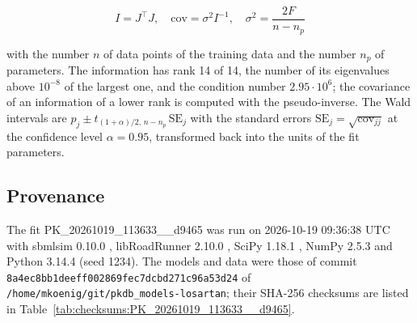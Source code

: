 \documentclass{article}
\begin{document}
\begin{equation}
I = J^\top J, \quad \mathrm{cov} = \sigma^2 I^{-1}, \quad \sigma^2 = \frac{2 F}{n - n_p}
\end{equation}

with the number $n$ of data points of the training data and the number $n_p$ of parameters. The information has rank 14 of 14, the number of its eigenvalues above $10^{-8}$ of the largest one, and the condition number $2.95 \cdot 10^{6}$; the covariance of an information of a lower rank is computed with the pseudo-inverse. The Wald intervals are $\hat{p}_j \pm t_{(1+\alpha)/2,\, n-n_p}\, \mathrm{SE}_j$ with the standard errors $\mathrm{SE}_j = \sqrt{\mathrm{cov}_{jj}}$ at the confidence level $\alpha = 0.95$, transformed back into the units of the fit parameters.

\subsection{Provenance}

The fit PK\_20261019\_113633\_\_d9465 was run on 2026-10-19 09:36:38 UTC with sbmlsim 0.10.0 \cite{Koenig2026_sbmlsim}, libRoadRunner 2.10.0 \cite{Welsh2023}, SciPy 1.18.1 \cite{Virtanen2020}, NumPy 2.5.3 \cite{Harris2020} and Python 3.14.4 (seed 1234). The models and data were those of commit \texttt{8a4ec8bb1deeff002869fec7dcbd271c96a53d24} of \texttt{/home/mkoenig/git/pkdb\_models-losartan}; their SHA-256 checksums are listed in Table~\ref{tab:checksums:PK_20261019_113633__d9465}.
\end{document}
